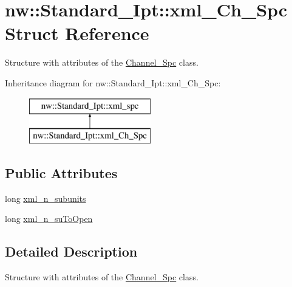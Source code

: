 \hypertarget{structnw_1_1_standard___ipt_1_1xml___ch___spc}{\section{nw\+:\+:Standard\+\_\+\+Ipt\+:\+:xml\+\_\+\+Ch\+\_\+\+Spc Struct Reference}
\label{structnw_1_1_standard___ipt_1_1xml___ch___spc}
}


Structure with attributes of the \hyperlink{classnw_1_1_channel___spc}{Channel\+\_\+\+Spc} class.  


Inheritance diagram for nw\+:\+:Standard\+\_\+\+Ipt\+:\+:xml\+\_\+\+Ch\+\_\+\+Spc\+:\begin{figure}[H]
\begin{center}
\leavevmode
\includegraphics[height=2.000000cm]{d0/d51/structnw_1_1_standard___ipt_1_1xml___ch___spc}
\end{center}
\end{figure}
\subsection*{Public Attributes}
\begin{DoxyCompactItemize}
\item 
long \hyperlink{structnw_1_1_standard___ipt_1_1xml___ch___spc_add361d89d7c6461ba8b6fb75dffa9b82}{xml\+\_\+n\+\_\+subunits}
\item 
long \hyperlink{structnw_1_1_standard___ipt_1_1xml___ch___spc_a7bfa8a0c0cb063b0147a076e4dfcb5f9}{xml\+\_\+n\+\_\+su\+To\+Open}
\end{DoxyCompactItemize}


\subsection{Detailed Description}
Structure with attributes of the \hyperlink{classnw_1_1_channel___spc}{Channel\+\_\+\+Spc} class. 

